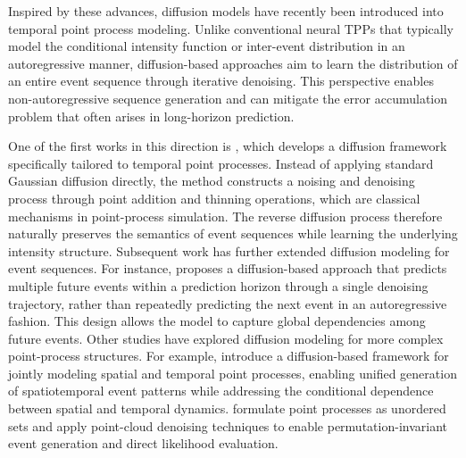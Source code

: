\documentclass[10pt]{article} %
\begin{document}
Inspired by these advances, diffusion models have recently been introduced into temporal point process modeling. Unlike conventional neural TPPs that typically model the conditional intensity function or inter-event distribution in an autoregressive manner, diffusion-based approaches aim to learn the distribution of an entire event sequence through iterative denoising. This perspective enables non-autoregressive sequence generation and can mitigate the error accumulation problem that often arises in long-horizon prediction. 

One of the first works in this direction is \citet{ludke2023add}, which develops a diffusion framework specifically tailored to temporal point processes. Instead of applying standard Gaussian diffusion directly, the method constructs a noising and denoising process through point addition and thinning operations, which are classical mechanisms in point-process simulation. The reverse diffusion process therefore naturally preserves the semantics of event sequences while learning the underlying intensity structure.
Subsequent work has further extended diffusion modeling for event sequences. For instance, \citet{kerrigan2024eventflow} proposes a diffusion-based approach that predicts multiple future events within a prediction horizon through a single denoising trajectory, rather than repeatedly predicting the next event in an autoregressive fashion. This design allows the model to capture global dependencies among future events. Other studies have explored diffusion modeling for more complex point-process structures. For example, \citet{yuan2023spatio} introduce a diffusion-based framework for jointly modeling spatial and temporal point processes, enabling unified generation of spatiotemporal event patterns while addressing the conditional dependence between spatial and temporal dynamics. \citet{ludke2024unlocking} formulate point processes as unordered sets and apply point-cloud denoising techniques to enable permutation-invariant event generation and direct likelihood evaluation. 
\end{document}
